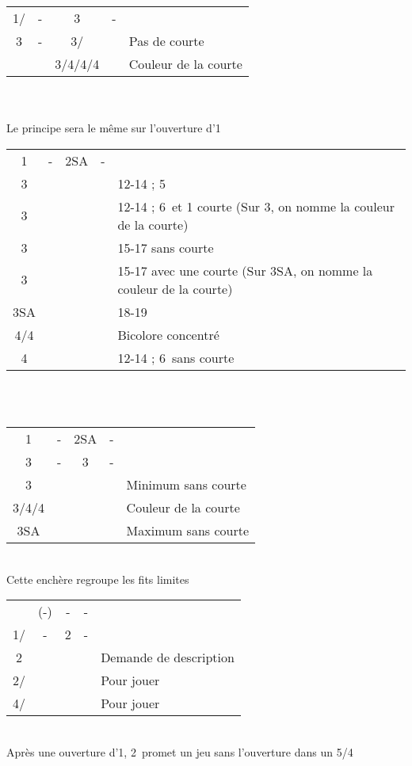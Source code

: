 \documentclass[a4paper, oneside, 11pt]{report}
\begin{document}
		\begin{tabular}{cccc|l}
		1\coeur/\pique & - & 3\trefle & - &\\
		3\carreau & - & 3\coeur/\pique && Pas de courte\\
		&& 3\pique/4\trefle/4\carreau/4\coeur && Couleur de la courte\\
		\end{tabular}\\\\

		Le principe sera le même sur l'ouverture d'1\pique\\
		
		\begin{tabular}{cccc|l}
		1\coeur & - & 2SA & - &\\
		3\trefle &&&& 12-14 ; 5\coeur\\
		3\carreau &&&& 12-14 ; 6\coeur\ et 1 courte (Sur 3\coeur, on nomme la couleur de la courte)\\
		3\coeur &&&& 15-17 sans courte\\
		3\pique &&&& 15-17 avec une courte (Sur 3SA, on nomme la couleur de la courte)\\
		3SA &&&& 18-19\\
		4\trefle/4\carreau &&&& Bicolore concentré\\
		4\coeur &&&& 12-14 ; 6\coeur\ sans courte\\
		\end{tabular}\\\\
		
		\begin{tabular}{cccc|l}
		1\coeur & - & 2SA & - &\\
		3\trefle & - & 3\carreau & - &\\
		3\coeur &&&& Minimum sans courte\\
		3\pique/4\trefle/4\carreau &&&& Couleur de la courte\\
		3SA &&&& Maximum sans courte\\
		\end{tabular}\\
	
\newpage
		Cette enchère regroupe les fits limites\\
		\begin{tabular}{cccc|l}
		& (-) & - & - &\\
		1\coeur/\pique & - & 2\trefle & - &\\
		2\carreau &&&& Demande de description\\
		2\coeur/\pique &&&& Pour jouer\\
		4\coeur/\pique &&&& Pour jouer\\
		\end{tabular}\\
		Après une ouverture d'1\pique, 2\coeur\ promet un jeu sans l'ouverture dans un 5/4\\
\end{document}
